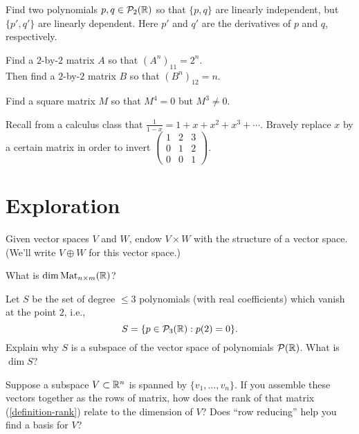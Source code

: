 \documentclass{homework}
\begin{document}
\begin{problem}
  Find two polynomials $p,q \in \mathcal{P}_{2}(\mathbb{R})$ so that $\{p,q\}$ are linearly independent, but $\{p',q'\}$ are linearly dependent.  Here $p'$ and $q'$ are the derivatives of $p$ and $q$, respectively.
\end{problem}

\begin{problem}
  Find a $2$-by-$2$ matrix $A$ so that $(A^n)_{11} = 2^n$.  \\
  Then find a $2$-by-$2$ matrix $B$ so that $(B^n)_{12} = n$.
\end{problem}

\begin{problem}
  Find a square matrix $M$ so that $M^4 = 0$ but $M^3 \neq 0$.
\end{problem}

\begin{problem}
  Recall from a calculus class that
  $\frac{1}{1-x} = 1 + x + x^2 + x^3 + \cdots$.  Bravely replace $x$
  by a certain matrix in order to invert
  $\begin{pmatrix} 1 & 2 & 3 \\ 0 & 1 & 2 \\ 0 & 0 & 1 \end{pmatrix}$.
\end{problem}

\section{Exploration}

\begin{problem}
  Given vector spaces $V$ and $W$, endow $V \times W$ with the
  structure of a vector space.  (We'll write $V \oplus W$ for this
  vector space.)
\end{problem}

\begin{problem}
  What is $\dim \operatorname{Mat}_{n \times m}(\mathbb{R})$?
\end{problem}

\begin{problem}
  Let $S$ be the set of degree $\leq 3$ polynomials (with real
  coefficients) which vanish at the point $2$, i.e.,
  \[ S = \{ p \in \mathcal{P}_{3}(\mathbb{R}) : p(2) = 0 \}. \] Explain
  why $S$ is a subspace of the vector space of polynomials
  $\mathcal{P}(\mathbb{R})$.  What is $\dim S$?
\end{problem}

\begin{problem}
  Suppose a subspace $V \subset \mathbb{R}^n$ is spanned by
  $\{v_1,\ldots,v_n\}$.  If you assemble these vectors together as the
  rows of matrix, how does the rank of that matrix
  (\ref{definition-rank}) relate to the dimension of $V$?  Does ``row
  reducing'' help you find a basis for $V$?
\end{problem}
\end{document}
